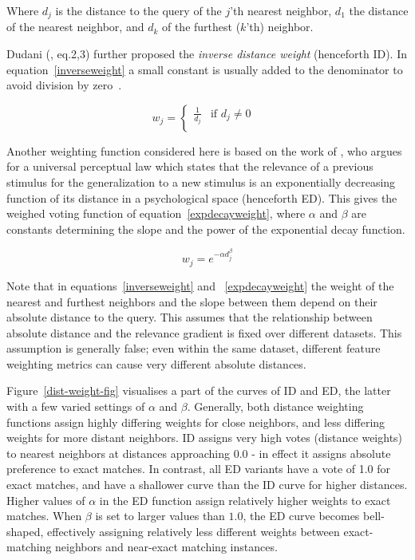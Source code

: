 \documentclass{report}
\begin{document}
Where $d_{j}$ is the distance to the query of the $j$'th nearest
neighbor, $d_{1}$ the distance of the nearest neighbor, and $d_{k}$ of
the furthest ($k$'th) neighbor.

Dudani (, eq.2,3) further proposed the {\em inverse
distance weight} (henceforth ID). In equation~\ref{inverseweight} a
small constant is usually added to the denominator to avoid division
by zero~\cite{Wettschereck94}.

\begin{equation}
\label{inverseweight}
w_{j}= \left \{ \begin{array}{ll}  
                        \frac{1}{d_{j}} & \mbox{if $d_{j} \not= 0$ } \\ 
                    \end{array} 
          \right. 
\end{equation}

Another weighting function considered here is based on the work of
, who argues for a universal perceptual law which
states that the relevance of a previous stimulus for the
generalization to a new stimulus is an exponentially decreasing
function of its distance in a psychological space (henceforth
ED). This gives the weighed voting function of
equation~\ref{expdecayweight}, where $\alpha$ and $\beta$ are
constants determining the slope and the power of the exponential decay
function.

\begin{equation}
\label{expdecayweight}
w_{j}= e^{-\alpha d_{j}^\beta}
\end{equation}

Note that in equations~\ref{inverseweight} and ~\ref{expdecayweight}
the weight of the nearest and furthest neighbors and the slope between
them depend on their absolute distance to the query. This assumes that
the relationship between absolute distance and the relevance gradient
is fixed over different datasets. This assumption is generally false;
even within the same dataset, different feature weighting metrics can
cause very different absolute distances. 

Figure~\ref{dist-weight-fig} visualises a part of the curves of ID and
ED, the latter with a few varied settings of $\alpha$ and
$\beta$. Generally, both distance weighting functions assign highly
differing weights for close neighbors, and less differing weights for
more distant neighbors. ID assigns very high votes (distance weights)
to nearest neighbors at distances approaching 0.0 - in effect it
assigns absolute preference to exact matches. In contrast, all ED
variants have a vote of 1.0 for exact matches, and have a shallower
curve than the ID curve for higher distances. Higher values of
$\alpha$ in the ED function assign relatively higher weights to exact
matches. When $\beta$ is set to larger values than $1.0$, the ED curve
becomes bell-shaped, effectively assigning relatively less different
weights between exact-matching neighbors and near-exact matching
instances.
\end{document}
